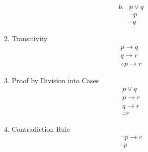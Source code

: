 \documentclass[12pt]{article}
\begin{document}
\begin{enumerate}
        \[
        \begin{array}{ll}
        b. & p \vee q \\
        & \neg p \\
        & \therefore q
        \end{array}
        \]
    \item Transitivity
        \[
        \begin{array}{c}
        p \rightarrow q \\
        q \rightarrow r \\
        \therefore p \rightarrow r
        \end{array}
        \]
    \item Proof by Division into Cases
        \[
        \begin{array}{c}
        p \vee q \\
        p \rightarrow r \\
        q \rightarrow r \\
        \therefore r
        \end{array}
        \]
    \item Contradiction Rule
        \[
        \begin{array}{c}
        \neg p \rightarrow c \\
        \therefore p
        \end{array}
        \]
\end{enumerate}
\newpage
\end{document}
